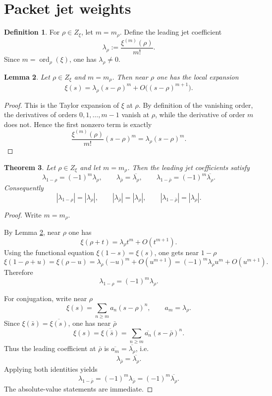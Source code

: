 \documentclass[11pt,a4paper]{article}
\newtheorem{theorem}{Theorem}[section]
\newtheorem{lemma}[theorem]{Lemma}
\theoremstyle{definition}
\newtheorem{definition}[theorem]{Definition}
\theoremstyle{remark}
\DeclareMathOperator{\ord}{ord}
\begin{document}
\section{Packet jet weights}

\begin{definition}
For $\rho\in Z_\xi$, let $m=m_\rho$.  Define the leading jet coefficient
\[
\lambda_\rho:=\frac{\xi^{(m)}(\rho)}{m!}.
\]
Since $m=\ord_\rho(\xi)$, one has $\lambda_\rho\ne 0$.
\end{definition}

\begin{lemma}\label{lem:local-expansion}
Let $\rho\in Z_\xi$ and $m=m_\rho$.  Then near $\rho$ one has the local expansion
\[
\xi(s)=\lambda_\rho (s-\rho)^m + O\bigl((s-\rho)^{m+1}\bigr).
\]
\end{lemma}

\begin{proof}
This is the Taylor expansion of $\xi$ at $\rho$.  By definition of the vanishing order, the derivatives of orders $0,1,\dots,m-1$ vanish at $\rho$, while the derivative of order $m$ does not.  Hence the first nonzero term is exactly
\[
\frac{\xi^{(m)}(\rho)}{m!}(s-\rho)^m=\lambda_\rho (s-\rho)^m.
\]
\end{proof}

\begin{theorem}\label{thm:lambda-transform}
Let $\rho\in Z_\xi$ and let $m=m_\rho$.  Then the leading jet coefficients satisfy
\[
\lambda_{1-\rho}=(-1)^m\lambda_\rho,
\qquad
\lambda_{\bar\rho}=\overline{\lambda_\rho},
\qquad
\lambda_{1-\bar\rho}=(-1)^m\overline{\lambda_\rho}.
\]
Consequently
\[
|\lambda_{1-\rho}|=|\lambda_{\rho}|,
\qquad
|\lambda_{\bar\rho}|=|\lambda_\rho|,
\qquad
|\lambda_{1-\bar\rho}|=|\lambda_\rho|.
\]
\end{theorem}

\begin{proof}
Write $m=m_\rho$.

By Lemma \ref{lem:local-expansion}, near $\rho$ one has
\[
\xi(\rho+t)=\lambda_\rho t^m + O(t^{m+1}).
\]
Using the functional equation $\xi(1-s)=\xi(s)$, one gets near $1-\rho$
\[
\xi(1-\rho+u)=\xi(\rho-u)=\lambda_\rho (-u)^m + O(u^{m+1})
=(-1)^m\lambda_\rho u^m + O(u^{m+1}).
\]
Therefore
\[
\lambda_{1-\rho}=(-1)^m\lambda_\rho.
\]

For conjugation, write near $\rho$
\[
\xi(s)=\sum_{n\ge m} a_n (s-\rho)^n,
\qquad a_m=\lambda_\rho.
\]
Since $\xi(\bar s)=\overline{\xi(s)}$, one has near $\bar\rho$
\[
\xi(s)=\overline{\xi(\bar s)}=
\sum_{n\ge m} \overline{a_n}(s-\bar\rho)^n.
\]
Thus the leading coefficient at $\bar\rho$ is $\overline{a_m}=\overline{\lambda_\rho}$, i.e.
\[
\lambda_{\bar\rho}=\overline{\lambda_\rho}.
\]
Applying both identities yields
\[
\lambda_{1-\bar\rho}=(-1)^m\lambda_{\bar\rho}=(-1)^m\overline{\lambda_\rho}.
\]
The absolute-value statements are immediate.
\end{proof}
\end{document}
